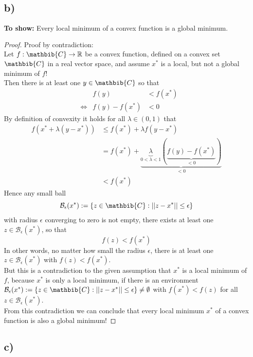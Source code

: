 \documentclass[a4paper]{article}
\begin{document}
    \subsection*{b)}
        \textbf{To show:} Every local minimum of a convex function is a global minimum.
        \begin{proof}
            Proof by contradiction:\\
            Let $f: \mathbib{C} \rightarrow \mathbb{R}$ be a convex function, defined on a convex set $\mathbib{C}$ in a real vector space, and assume $x^*$ is a local, but not a global minimum of $f$!\\
            Then there is at least one $y \in \mathbib{C}$ so that
            \begin{align}
                & & f(y) &< f(x^*)\\
                &\Leftrightarrow & f(y) - f(x^*) &< 0
            \end{align}
            By definition of convexity it holds for all $\lambda \in (0,1)$ that
            \begin{align}
                f(x^* + \lambda (y - x^*)) &\leq f(x^*) + \lambda f(y - x^*)\\
                &= f(x^*) + \underbrace{\underbrace{\lambda}_{0 < \lambda < 1} (\underbrace{f(y) - f(x^*)}_{< 0})}_{< 0}\\
                &< f(x^*)
            \end{align}
            Hence any small ball
            $$\mathcal{B}_{\epsilon}(x^*) := \{z \in \mathbib{C} : ||z-x^*|| \leq \epsilon\}$$
            with radius $\epsilon$ converging to zero is not empty, there exists at least one $z \in \mathcal{B}_{\epsilon}(x^*)$, so that
            $$f(z) < f(x^*)$$
            In other words, no matter how small the radius $\epsilon$, there is at least one $z \in \mathcal{B}_{\epsilon}(x^*)$ with $f(z) < f(x^*)$.\\
            But this is a contradiction to the given assumption that $x^*$ is a local minimum of $f$, because $x^*$ is only a local minimum, if there is an environment $\mathcal{B}_{\epsilon}(x^*) := \{z \in \mathbib{C} : ||z-x^*|| \leq \epsilon\} \neq \emptyset$ with $f(x^*) < f(z)$ for all $z \in \mathcal{B}_{\epsilon}(x^*)$.\\
            From this contradiction we can conclude that every local minimum $x^*$ of a convex function is also a global minimum!
        \end{proof}
        
        
    \subsection*{c)}
        
    
    
\end{document}
